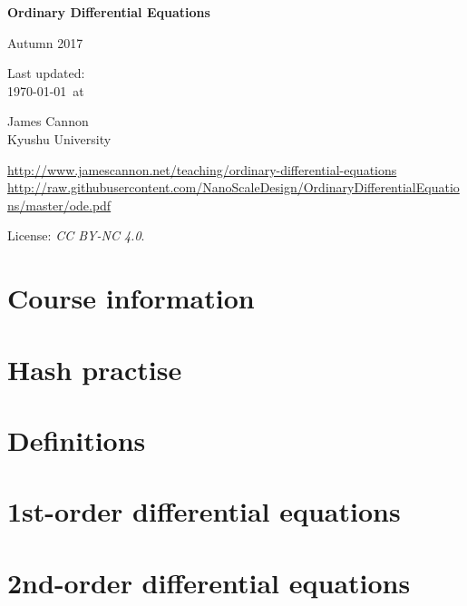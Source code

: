 \documentclass[a4paper]{book} %
\newcommand{\courseyear}{2017 }
\newcommand{\courseurl}{ordinary-differential-equations}
\begin{document}
\begin{titlepage}
    \begin{center}
        \vspace*{1cm}

        \Huge
        \textbf{Ordinary Differential Equations}

        Autumn \courseyear

        \vspace{1.5cm}
        \Large
        Last updated:\\\today \ at \currenttime

        \vspace{4.0cm}
        \LARGE
        James Cannon\\Kyushu University
        \vfill

        \normalsize
        \url{http://www.jamescannon.net/teaching/\courseurl}\\
        \vspace{0.3cm}
        \small
        \url{http://raw.githubusercontent.com/NanoScaleDesign/OrdinaryDifferentialEquations/master/ode.pdf}
        \vspace{0.5cm}

        License: \emph{CC BY-NC 4.0}.

    \end{center}
\end{titlepage}

\setcounter{chapter}{-1}

\tableofcontents

\chapter{Course information}
\newpage



%

\chapter{Hash practise}

\chapter{Definitions}

\chapter{1st-order differential equations}

\chapter{2nd-order differential equations}

\end{document}
